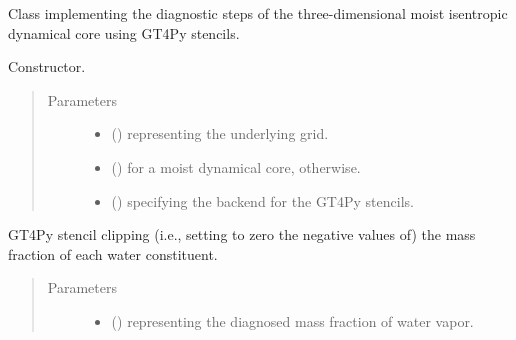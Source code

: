 \documentclass[letterpaper,10pt,english]{sphinxmanual}
\begin{document}
\begin{fulllineitems}
\label{\detokenize{api:dycore.diagnostic_isentropic.DiagnosticIsentropic}}
Class implementing the diagnostic steps of the three-dimensional moist isentropic dynamical core
using GT4Py stencils.

\begin{fulllineitems}
\label{\detokenize{api:dycore.diagnostic_isentropic.DiagnosticIsentropic.__init__}}
Constructor.
\begin{quote}\begin{description}
\item[{Parameters}] \leavevmode\begin{itemize}
\item {} 
 () \textendash{} {\hyperref[\detokenize{api:grids.grid_xyz.GridXYZ}]{}} representing the underlying grid.

\item {} 
 () \textendash{}  for a moist dynamical core,  otherwise.

\item {} 
 () \textendash{}  specifying the backend for the GT4Py stencils.

\end{itemize}

\end{description}\end{quote}

\end{fulllineitems}


\begin{fulllineitems}
\label{\detokenize{api:dycore.diagnostic_isentropic.DiagnosticIsentropic._stencil_clipping_defs}}
GT4Py stencil clipping (i.e., setting to zero the negative values of) the mass fraction of each water constituent.
\begin{quote}\begin{description}
\item[{Parameters}] \leavevmode\begin{itemize}
\item {} 
 () \textendash{}  representing the diagnosed mass fraction of water vapor.


\end{itemize}
\end{description}
\end{quote}
\end{fulllineitems}
\end{fulllineitems}
\end{document}
